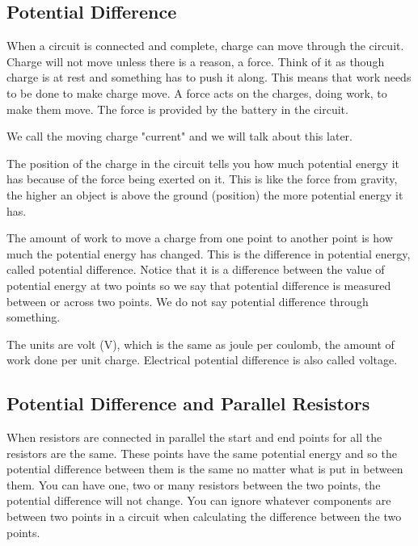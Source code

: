 \subsection{Potential Difference}

When a circuit is connected and complete, charge can move through the circuit. Charge will not move unless there is a reason, a force. Think of it as though charge is at rest and something has to push it along. This means that work needs to be done to make charge move. A force acts on the charges, doing work, to make them move. The force is provided by the battery in the circuit.


We call the moving charge "current" and we will talk about this later.


The position of the charge in the circuit tells you how much potential energy it has because of the force being exerted on it. This is like the force from gravity, the higher an object is above the ground (position) the more potential energy it has.


The amount of work to move a charge from one point to another point is how much the potential energy has changed. This is the difference in potential energy, called potential difference. Notice that it is a difference between the value of potential energy at two points so we say that potential difference is measured between or across two points. We do not say potential difference through something.



The units are volt (V), which is the same as joule per coulomb, the amount of work done per unit charge. Electrical potential difference is also called voltage.

\subsection{Potential Difference and Parallel Resistors}

When resistors are connected in parallel the start and end points for all the resistors are the same. These points have the same potential energy and so the potential difference between them is the same no matter what is put in between them. You can have one, two or many resistors between the two points, the potential difference will not change. You can ignore whatever components are between two points in a circuit when calculating the difference between the two points.

